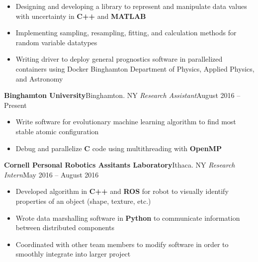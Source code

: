 \documentclass[11pt]{article}
\begin{document}
\begin{itemize}
	\item Designing and developing a library to represent and manipulate data values with uncertainty in \textbf{C++} and \textbf{MATLAB}
	\item Implementing sampling, resampling, fitting, and calculation methods for random variable datatypes
	\item Writing driver to deploy general prognostics software in parallelized containers using Docker Binghamton Department of Physics, Applied Physics, and Astronomy
\end{itemize}
\textbf{Binghamton University}\hfill Binghamton. NY
\textit{Research Assistant}\hfill August 2016 – Present
\begin{itemize}
	\item Write software for evolutionary machine learning algorithm to find most stable atomic configuration
	\item Debug and parallelize \textbf{C} code using multithreading with \textbf{OpenMP}
\end{itemize}
\textbf{Cornell Personal Robotics Assitants Laboratory}\hfill Ithaca. NY
\textit{Research Intern}\hfill May 2016 – August 2016
\begin{itemize}
	\item Developed algorithm in \textbf{C++} and \textbf{ROS} for robot to visually identify properties of an object (shape, texture, etc.)
	\item Wrote data marshalling software in \textbf{Python} to communicate information between distributed components
	\item Coordinated with other team members to modify software in order to smoothly integrate into larger project
\end{itemize}
\vspace{2mm}
\end{document}
